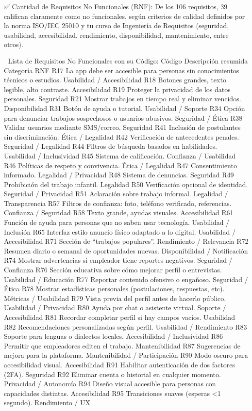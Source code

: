 ✅ Cantidad de Requisitos No Funcionales (RNF):
De los 106 requisitos, 39 califican claramente como no funcionales, según criterios de calidad definidos por la norma ISO/IEC 25010 y tu curso de Ingeniería de Requisitos (seguridad, usabilidad, accesibilidad, rendimiento, disponibilidad, mantenimiento, entre otros).

🧩 Lista de Requisitos No Funcionales con su Código:
Código	Descripción resumida	Categoría RNF
R17	La app debe ser accesible para personas sin conocimientos técnicos o estudios.	Usabilidad / Accesibilidad
R18	Botones grandes, texto legible, alto contraste.	Accesibilidad
R19	Proteger la privacidad de los datos personales.	Seguridad
R21	Mostrar trabajos en tiempo real y eliminar vencidos.	Disponibilidad
R31	Botón de ayuda o tutorial.	Usabilidad / Soporte
R34	Opción para denunciar trabajos sospechosos o usuarios abusivos.	Seguridad / Ética
R38	Validar usuarios mediante SMS/correo.	Seguridad
R41	Inclusión de postulantes sin discriminación.	Ética / Legalidad
R42	Verificación de antecedentes penales.	Seguridad / Legalidad
R44	Filtros de búsqueda basados en habilidades.	Usabilidad / Inclusividad
R45	Sistema de calificación.	Confianza / Usabilidad
R46	Políticas de respeto y convivencia.	Ética / Legalidad
R47	Consentimiento informado.	Legalidad / Privacidad
R48	Sistema de denuncias.	Seguridad
R49	Prohibición del trabajo infantil.	Legalidad
R50	Verificación opcional de identidad.	Seguridad / Privacidad
R51	Aclaración sobre trabajo informal.	Legalidad / Transparencia
R57	Filtros de confianza: foto, teléfono verificado, referencias.	Confianza / Seguridad
R58	Texto grande, ayudas visuales.	Accesibilidad
R61	Función de ayuda para personas que no saben usar tecnología.	Usabilidad / Inclusión
R65	Interfaz estilo anuncio físico adaptado a lo digital.	Usabilidad / Accesibilidad
R71	Sección de “trabajos populares”.	Rendimiento / Relevancia
R72	Resumen diario o semanal de oportunidades nuevas.	Disponibilidad / Notificación
R74	Mostrar advertencias si empleador tiene reportes negativos.	Seguridad / Confianza
R76	Sección educativa sobre cómo mejorar perfil o entrevistas.	Usabilidad / Educación
R77	Reportar contenido ofensivo o engañoso.	Seguridad / Ética
R78	Mostrar estadísticas personales (postulaciones, respuestas, etc).	Métricas / Usabilidad
R79	Vista previa del perfil antes de hacerlo público.	Usabilidad / Privacidad
R80	Ayuda por chat o asistente virtual.	Soporte / Accesibilidad
R81	Recordar completar perfil si hay campos vacíos.	Usabilidad
R82	Recomendaciones personalizadas según perfil.	Usabilidad / Rendimiento
R83	Soporte para lenguas o dialectos locales.	Accesibilidad / Inclusividad
R86	Permitir que empleadores editen el trabajo.	Mantenibilidad
R87	Sugerencias de mejora para la plataforma.	Mantenibilidad / Participación
R90	Modo oscuro para accesibilidad visual.	Accesibilidad
R91	Habilitar autenticación de dos factores (2FA).	Seguridad
R92	Eliminar cuenta o historial en cualquier momento.	Privacidad / Autonomía
R94	Diseño visual accesible para personas con capacidades distintas.	Accesibilidad
R95	Transiciones suaves (esperas <1 segundo).	Rendimiento / UX

